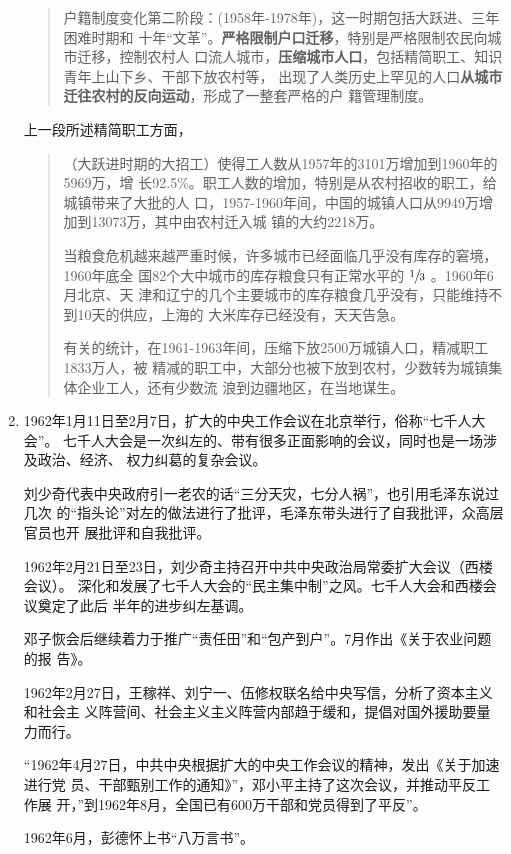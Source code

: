 \begin{enumerate}
\begin{quotation}
    户籍制度变化第二阶段：(1958年-1978年)，这一时期包括大跃进、三年困难时期和
    十年“文革”。\textbf{严格限制户口迁移}，特别是严格限制农民向城市迁移，控制农村人
    口流人城市，\textbf{压缩城市人口}，包括精简职工、知识青年上山下乡、干部下放农村等，
    出现了人类历史上罕见的人口\textbf{从城市迁往农村的反向运动}，形成了一整套严格的户
    籍管理制度。\cite{quxiaohuji}
  \end{quotation}

  上一段所述精简职工方面，
  \begin{quotation}
    （大跃进时期的大招工）使得工人数从1957年的3101万增加到1960年的5969万，增
    长92.5\%。职工人数的增加，特别是从农村招收的职工，给城镇带来了大批的人
    口，1957-1960年间，中国的城镇人口从9949万增加到13073万，其中由农村迁入城
    镇的大约2218万。

    当粮食危机越来越严重时候，许多城市已经面临几乎没有库存的窘境，1960年底全
    国82个大中城市的库存粮食只有正常水平的 $\sfrac{1}{3}$ 。1960年6月北京、天
    津和辽宁的几个主要城市的库存粮食几乎没有，只能维持不到10天的供应，上海的
    大米库存已经没有，天天告急。

    有关的统计，在1961-1963年间，压缩下放2500万城镇人口，精减职工1833万人，被
    精减的职工中，大部分也被下放到农村，少数转为城镇集体企业工人，还有少数流
    浪到边疆地区，在当地谋生。\cite{jingjianzhigong}
  \end{quotation}

\item 1962年1月11日至2月7日，扩大的中央工作会议在北京举行，俗称“七千人大会”。
  七千人大会是一次纠左的、带有很多正面影响的会议，同时也是一场涉及政治、经济、
  权力纠葛的复杂会议。

  刘少奇代表中央政府引一老农的话“三分天灾，七分人祸”，也引用毛泽东说过几次
  的“指头论”对左的做法进行了批评，毛泽东带头进行了自我批评，众高层官员也开
  展批评和自我批评。

  1962年2月21日至23日，刘少奇主持召开中共中央政治局常委扩大会议（西楼会议）。
  深化和发展了七千人大会的“民主集中制”之风。七千人大会和西楼会议奠定了此后
  半年的进步纠左基调。

  邓子恢会后继续着力于推广“责任田”和“包产到户”。7月作出《关于农业问题的报
  告》。

  1962年2月27日，王稼祥、刘宁一、伍修权联名给中央写信，分析了资本主义和社会主
  义阵营间、社会主义主义阵营内部趋于缓和，提倡对国外援助要量力而行。

  “1962年4月27日，中共中央根据扩大的中央工作会议的精神，发出《关于加速进行党
  员、干部甄别工作的通知》”，邓小平主持了这次会议，并推动平反工作展
  开，”到1962年8月，全国已有600万干部和党员得到了平反”。

  1962年6月，彭德怀上书“八万言书”。
\end{enumerate}


